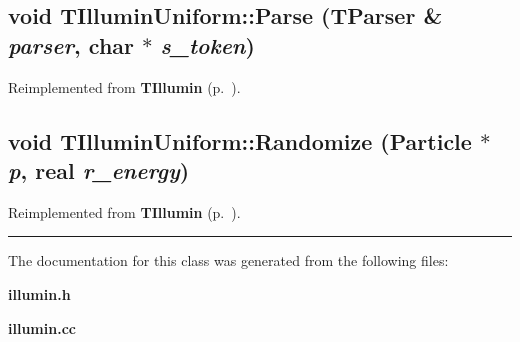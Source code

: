 \label{TIlluminUniform_a1}
\subsection{\setlength{\rightskip}{0pt plus 5cm}void TIllumin\-Uniform::Parse ({\bf TParser} \& {\em parser}, char $\ast$ {\em s\_\-token})\hspace{0.3cm}{\tt  [virtual]}}



Reimplemented from {\bf TIllumin} {\rm (p.~\pageref{TIllumin_a0})}.\label{TIlluminUniform_a2}
\subsection{\setlength{\rightskip}{0pt plus 5cm}void TIllumin\-Uniform::Randomize ({\bf Particle} $\ast$ {\em p}, {\bf real} {\em r\_\-energy})\hspace{0.3cm}{\tt  [virtual]}}



Reimplemented from {\bf TIllumin} {\rm (p.~\pageref{TIllumin_a1})}.\vspace{0.4cm}\hrule\vspace{0.2cm}
The documentation for this class was generated from the following files:\begin{CompactItemize}
\item 
{\bf illumin.h}\item 
{\bf illumin.cc}\end{CompactItemize}
